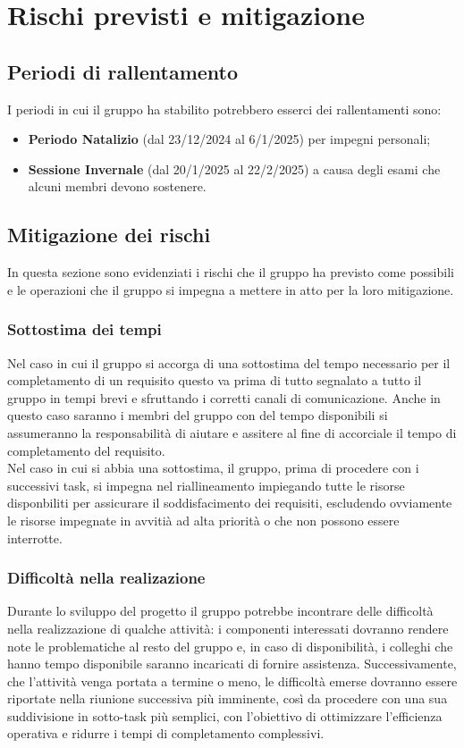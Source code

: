 \section{Rischi previsti e mitigazione}
\subsection{Periodi di rallentamento}
I periodi in cui il gruppo ha stabilito potrebbero esserci dei rallentamenti sono:
\begin{itemize}
    \item \textbf{Periodo Natalizio} (dal 23/12/2024 al 6/1/2025) per impegni personali;
    \item \textbf{Sessione Invernale} (dal 20/1/2025 al 22/2/2025) a causa degli esami che alcuni membri devono sostenere.
\end{itemize}
\subsection{Mitigazione dei rischi}
In questa sezione sono evidenziati i rischi che il gruppo ha previsto come possibili e le operazioni che il gruppo si impegna a mettere in atto per la loro mitigazione.

\subsubsection{Sottostima dei tempi}
Nel caso in cui il gruppo si accorga di una sottostima del tempo necessario per il completamento di un requisito questo va prima di tutto segnalato a tutto il gruppo in tempi brevi e sfruttando i corretti canali di comunicazione. Anche in questo caso saranno i membri del gruppo con del tempo disponibili si assumeranno la responsabilità di aiutare e assitere al fine di accorciale il tempo di completamento del requisito.
\\
Nel caso in cui si abbia una sottostima, il gruppo, prima di procedere con i successivi task, si impegna nel riallineamento impiegando tutte le risorse disponbiliti per assicurare il soddisfacimento dei requisiti, escludendo ovviamente le risorse impegnate in avvitià ad alta priorità o che non possono essere interrotte.


\subsubsection{Difficoltà nella realizazione}
Durante lo sviluppo del progetto il gruppo potrebbe incontrare delle difficoltà nella realizzazione di qualche attività: i componenti interessati dovranno rendere note le problematiche al resto del gruppo e, in caso di disponibilità, i colleghi che hanno tempo disponibile saranno incaricati di fornire assistenza.
Successivamente, che l’attività venga portata a termine o meno, le difficoltà emerse dovranno essere riportate nella riunione successiva più imminente, così da procedere con una sua suddivisione in sotto-task più semplici, con l'obiettivo di ottimizzare l’efficienza operativa e ridurre i tempi di completamento complessivi.

